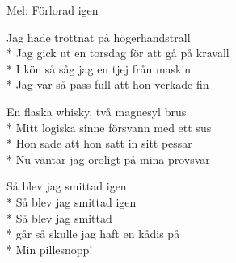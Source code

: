 \begin{SongText}
    \begin{SongInfo}
        Mel: Förlorad igen
    \end{SongInfo}
    \begin{SongVerse}
        Jag hade tröttnat på högerhandstrall\\*%
        Jag gick ut en torsdag för att gå på kravall\\*%
        I kön så såg jag en tjej från maskin\\*%
        Jag var så pass full att hon verkade fin
    \end{SongVerse}
    \begin{SongVerse}
        En flaska whisky, två magnesyl brus\\*%
        Mitt logiska sinne försvann med ett sus\\*%
        Hon sade att hon satt in sitt pessar\\*%
        Nu väntar jag oroligt på mina provsvar
    \end{SongVerse}
    \begin{SongVerse}
        Så blev jag smittad igen\\*%
        Så blev jag smittad igen\\*%
        Så blev jag smittad\\*%
        går så skulle jag haft en kådis på\\*%
        Min pillesnopp!
    \end{SongVerse}
\end{SongText}